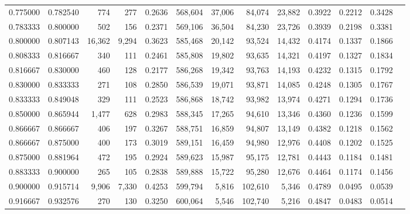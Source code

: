 \begin{tabular}{rrrrrrrrrrrrr}
0.775000 & 0.782540 &    774 &    277 &                                     0.2636 & 568,604 &  37,006 &  84,074 &  23,882 & 0.3922 & 0.2212 & 0.3428 \\
0.783333 & 0.800000 &    502 &    156 &                                     0.2371 & 569,106 &  36,504 &  84,230 &  23,726 & 0.3939 & 0.2198 & 0.3381 \\
0.800000 & 0.807143 & 16,362 &  9,294 &                                     0.3623 & 585,468 &  20,142 &  93,524 &  14,432 & 0.4174 & 0.1337 & 0.1866 \\
0.808333 & 0.816667 &    340 &    111 &                                     0.2461 & 585,808 &  19,802 &  93,635 &  14,321 & 0.4197 & 0.1327 & 0.1834 \\
0.816667 & 0.830000 &    460 &    128 &                                     0.2177 & 586,268 &  19,342 &  93,763 &  14,193 & 0.4232 & 0.1315 & 0.1792 \\
0.830000 & 0.833333 &    271 &    108 &                                     0.2850 & 586,539 &  19,071 &  93,871 &  14,085 & 0.4248 & 0.1305 & 0.1767 \\
0.833333 & 0.849048 &    329 &    111 &                                     0.2523 & 586,868 &  18,742 &  93,982 &  13,974 & 0.4271 & 0.1294 & 0.1736 \\
0.850000 & 0.865944 &  1,477 &    628 &                                     0.2983 & 588,345 &  17,265 &  94,610 &  13,346 & 0.4360 & 0.1236 & 0.1599 \\
0.866667 & 0.866667 &    406 &    197 &                                     0.3267 & 588,751 &  16,859 &  94,807 &  13,149 & 0.4382 & 0.1218 & 0.1562 \\
0.866667 & 0.875000 &    400 &    173 &                                     0.3019 & 589,151 &  16,459 &  94,980 &  12,976 & 0.4408 & 0.1202 & 0.1525 \\
0.875000 & 0.881964 &    472 &    195 &                                     0.2924 & 589,623 &  15,987 &  95,175 &  12,781 & 0.4443 & 0.1184 & 0.1481 \\
0.883333 & 0.900000 &    265 &    105 &                                     0.2838 & 589,888 &  15,722 &  95,280 &  12,676 & 0.4464 & 0.1174 & 0.1456 \\
0.900000 & 0.915714 &  9,906 &  7,330 &                                     0.4253 & 599,794 &   5,816 & 102,610 &   5,346 & 0.4789 & 0.0495 & 0.0539 \\
0.916667 & 0.932576 &    270 &    130 &                                     0.3250 & 600,064 &   5,546 & 102,740 &   5,216 & 0.4847 & 0.0483 & 0.0514 \\

\end{tabular}
